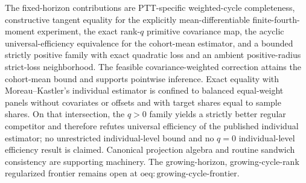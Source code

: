 \documentclass{article}
\begin{document}
The fixed-horizon contributions are PTT-specific weighted-cycle completeness, constructive tangent equality for the explicitly mean-differentiable finite-fourth-moment experiment, the exact rank-\(q\) primitive covariance map, the acyclic universal-efficiency equivalence for the cohort-mean estimator, and a bounded strictly positive family with exact quadratic loss and an ambient positive-radius strict-loss neighborhood. The feasible covariance-weighted correction attains the cohort-mean bound and supports pointwise inference. Exact equality with Moreau--Kastler's individual estimator is confined to balanced equal-weight panels without covariates or offsets and with target shares equal to sample shares. On that intersection, the \(q>0\) family yields a strictly better regular competitor and therefore refutes universal efficiency of the published individual estimator; no unrestricted individual-level bound and no \(q=0\) individual-level efficiency result is claimed. Canonical projection algebra and routine sandwich consistency are supporting machinery. The growing-horizon, growing-cycle-rank regularized frontier remains open at \(\mathrm{oeq{:}growing\text{-}cycle\text{-}frontier}\).
\end{document}
